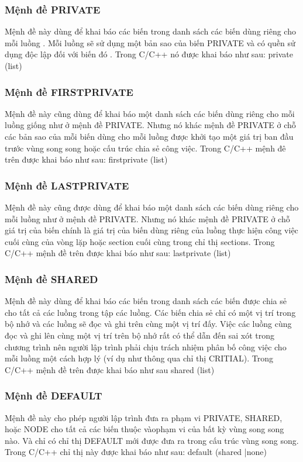 \documentclass{report}
\begin{document}
\subsubsection{Mệnh đề PRIVATE}
Mệnh đề này dùng để khai báo các biến trong danh sách các biến dùng riêng
cho mỗi luồng . Mỗi luồng sẽ sử dụng một bản sao của biến \textsf{PRIVATE} và có quền sử dụng độc lập đối với biến đó . Trong C/C++ nó được khai báo như sau:
\textsf{private (list)}
\subsubsection{Mệnh đề FIRSTPRIVATE}
Mệnh đề này cũng dùng để khai báo một danh sách các biến dùng riêng cho
mỗi luồng giống như ở mệnh đề \textsf{PRIVATE}. Nhưng nó khác mệnh đề \textsf{PRIVATE} ở chỗ
các bản sao của mỗi biến dùng cho mỗi luồng được khởi tạo một giá trị ban đầu trước
vùng song song hoặc cấu trúc chia sẻ công việc. Trong C/C++ mệnh đê trên được khai
báo như sau:
\textsf{firstprivate (list)}
\subsubsection{Mệnh đề LASTPRIVATE}
Mệnh đề này cũng được dùng để khai báo một danh sách các biến dùng riêng
cho mỗi luồng như ở mệnh đề \textsf{PRIVATE}. Nhưng nó khác mệnh đề \textsf{PRIVATE} ở chỗ
giá trị của biến chính là giá trị của biến dùng riêng của luồng thực hiện công việc cuối
cùng của vòng lặp hoặc section cuối cùng trong chỉ thị sections. Trong C/C++ mệnh
đề trên được khai báo như sau: \textsf{lastprivate (list)}

\subsubsection{Mệnh đề SHARED}
Mệnh đề này dùng để khai báo các biến trong danh sách các biến được chia sẻ
cho tất cả các luồng trong tập các luồng. Các biến chia sẻ chỉ có một vị trí trong bộ
nhớ và các luồng sẽ đọc và ghi trên cùng một vị trí đấy. Việc các luồng cùng đọc và
ghi lên cùng một vị trí trên bộ nhớ rất có thể dẫn đến sai xót trong chương trình nên
người lập trình phải chịu trách nhiệm phân bố công việc cho mỗi luồng một cách hợp
lý (ví dụ như thông qua chỉ thị \textsf{CRITIAL}). Trong C/C++ mệnh đề trên được khai báo như sau
\textsf{shared (list)}

\subsubsection{Mệnh đề DEFAULT}
Mệnh đề này cho phép người lập trình đưa ra phạm vi \textsf{PRIVATE, SHARED},
hoặc \textsf{NODE} cho tất cả các biến thuộc vàophạm vi của bất kỳ vùng song song nào. Và chỉ có chỉ thị \textsf{DEFAULT} mới được đưa ra trong cấu trúc vùng song song. Trong
C/C++ chỉ thị này được khai báo như sau:
\textsf{default (shared |none)}
\end{document}
